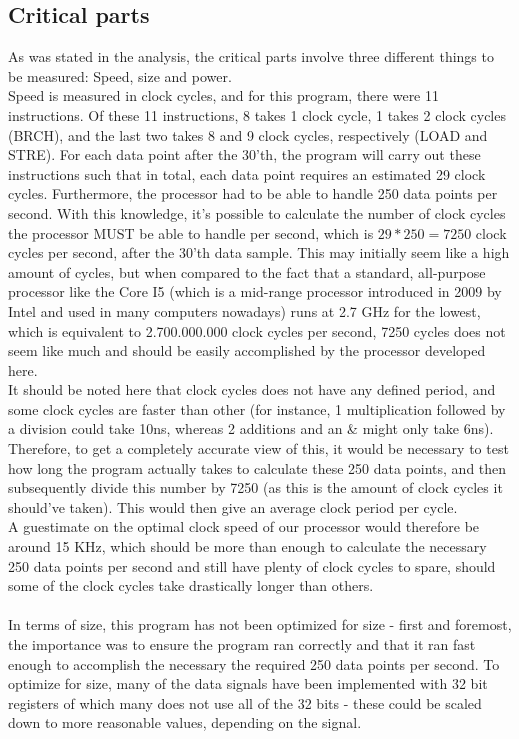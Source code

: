 \documentclass[12pt,a4paper]{article}
\begin{document}
\subsection{Critical parts}
	As was stated in the analysis, the critical parts involve three different things to be measured: Speed, size and power.\\
	Speed is measured in clock cycles, and for this program, there were 11 instructions. Of these 11 instructions, 8 takes 1 clock cycle, 1 takes 2 clock cycles (BRCH), and the last two takes 8 and 9 clock cycles, respectively (LOAD and STRE). For each data point after the 30'th, the program will carry out these instructions such that in total, each data point requires an estimated 29 clock cycles. Furthermore, the processor had to be able to handle 250 data points per second. With this knowledge, it's possible to calculate the number of clock cycles the processor MUST be able to handle per second, which is $29*250=7250$ clock cycles per second, after the 30'th data sample. This may initially seem like a high amount of cycles, but when compared to the fact that a standard, all-purpose processor like the Core I5 (which is a mid-range processor introduced in 2009 by Intel and used in many computers nowadays) runs at 2.7 GHz for the lowest, which is equivalent to 2.700.000.000 clock cycles per second, 7250 cycles does not seem like much and should be easily accomplished by the processor developed here.\\
	It should be noted here that clock cycles does not have any defined period, and some clock cycles are faster than other (for instance, 1 multiplication followed by a division could take 10ns, whereas 2 additions and an \& might only take 6ns). Therefore, to get a completely accurate view of this, it would be necessary to test how long the program actually takes to calculate these 250 data points, and then subsequently divide this number by 7250 (as this is the amount of clock cycles it should've taken). This would then give an average clock period per cycle.\\
	A guestimate on the optimal clock speed of our processor would therefore be around 15 KHz, which should be more than enough to calculate the necessary 250 data points per second and still have plenty of clock cycles to spare, should some of the clock cycles take drastically longer than others.\\
	\\
	In terms of size, this program has not been optimized for size - first and foremost, the importance was to ensure the program ran correctly and that it ran fast enough to accomplish the necessary the required 250 data points per second. To optimize for size, many of the data signals have been implemented with 32 bit registers of which many does not use all of the 32 bits - these could be scaled down to more reasonable values, depending on the signal.\\
\end{document}
